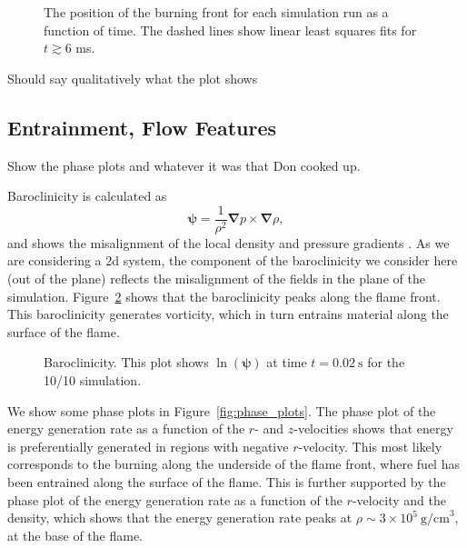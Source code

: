 \documentclass[preprint,times,tighten]{aastex63}
\newcommand{\nablab}{\mathbf{\nabla}}
\newcommand{\AssignTo}[1]{
    \marginpar{\vskip-\baselineskip%
               \raggedright%
               \tiny\sffamily%
               {\color{blue}\hrule%
               \smallskip%
               #1\par%
               \smallskip%
               \hrule}}%
}
\begin{document}
\begin{figure}[t]
\centering
{}
\caption{\label{fig:flame_speed}The position of the burning front for each simulation run as a function of time. The dashed lines show linear least squares fits for $t \gtrsim 6$ ms.}
\end{figure}

{\color{red} Should say qualitatively what the plot shows}

\subsection{Entrainment, Flow Features}

\AssignTo{Alice, Don}

Show the phase plots and whatever it was that Don cooked up.

Baroclinicity is calculated as
\begin{equation}
    \boldsymbol{\psi} = \frac{1}{\rho^2} \nablab p \times \nablab \rho,
\end{equation}
and shows the misalignment of the local density and pressure gradients
\citep{Malone2014a}. As we are considering a 2d system, the component of the
baroclinicity we consider here (out of the plane) reflects the misalignment
of the fields in the plane of the simulation. Figure~\ref{fig:baroclinicity}
shows that the baroclinicity peaks along the flame front. This baroclinicity
generates vorticity, which in turn entrains material along the surface of the
flame.

\begin{figure}[t]
\centering
{}
\caption{\label{fig:baroclinicity} Baroclinicity. This plot shows
$\ln \left(\mathbf{\psi}\right)$ at time $t = 0.02~\mathrm{s}$ for the 10/10 simulation.}
\end{figure}

We show some phase plots in Figure~\ref{fig:phase_plots}. The phase plot of the
energy generation rate as a function of
the $r$- and $z$-velocities shows that energy is preferentially generated in
regions with negative $r$-velocity. This most likely corresponds to the burning along the underside of the flame front, where fuel has been entrained along the surface of the flame. This is further supported by the phase plot of the energy generation rate as a function of the $r$-velocity
and the density, which shows that the energy generation rate peaks at
$\rho \sim 3 \times 10^5~\mathrm{g/cm}^3$, at the base of the flame.
\end{document}
